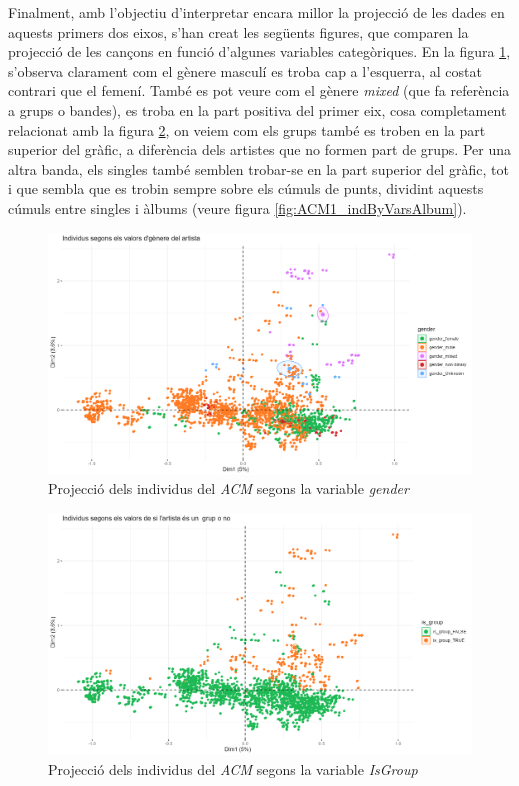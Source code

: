 Finalment, amb l'objectiu d'interpretar encara millor la projecció de les dades en aquests primers dos eixos, s'han creat les següents figures, que comparen la projecció de les cançons en funció d'algunes variables categòriques. En la figura \ref{fig:ACM1_indByGender}, s'observa clarament com el gènere masculí es troba cap a l'esquerra, al costat contrari que el femení. També es pot veure com el gènere \textit{mixed} (que fa referència a grups o bandes), es troba en la part positiva del primer eix, cosa completament relacionat amb la figura \ref{fig:ACM1_indByIsGroup}, on veiem com els grups també es troben en la part superior del gràfic, a diferència dels artistes que no formen part de grups. Per una altra banda, els singles també semblen trobar-se en la part superior del gràfic, tot i que sembla que es trobin sempre sobre els cúmuls de punts, dividint aquests cúmuls entre singles i àlbums (veure figura \ref{fig:ACM1_indByVarsAlbum}).


\begin{figure}[H]
    \centering
    \includegraphics[width=0.7\linewidth]{Images/6_Factorial_Methods/ACM/ACM1_indByGender.png}
    \caption{Projecció dels individus del \textit{ACM} segons la variable \textit{gender}}
    \label{fig:ACM1_indByGender}
\end{figure}

\begin{figure}[H]
    \centering
    \includegraphics[width=0.7\linewidth]{Images/6_Factorial_Methods/ACM/ACM1_indByIsGroup.png}
    \caption{Projecció dels individus del \textit{ACM} segons la variable \textit{IsGroup}}
    \label{fig:ACM1_indByIsGroup}
\end{figure}

